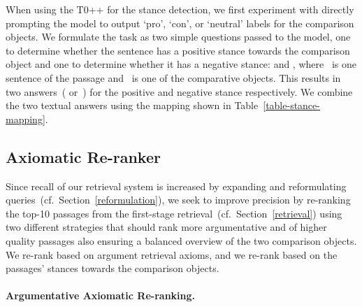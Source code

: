 When using the T0++ for the stance detection, we first experiment with directly prompting the model to output `pro', `con',  or `neutral' labels for the comparison objects.
We formulate the task as two simple questions passed to the model, one to determine whether the sentence has a positive stance towards the comparison object and one to determine whether it has a negative stance:  and , where ~is one sentence of the passage and ~is one of the comparative objects.
This results in two answers~( or~) for the positive and negative stance respectively. We combine the two textual answers using the mapping shown in Table~\ref{table-stance-mapping}.

\subsection{Axiomatic Re-ranker}
\label{reranking}


Since recall of our retrieval system is increased by expanding and reformulating queries~(cf.\ Section~\ref{reformulation}), we seek to improve precision by re-ranking the top-10 passages from the first-stage retrieval~(cf.\ Section~\ref{retrieval}) using two different strategies that should rank more argumentative and of higher quality passages also ensuring a balanced overview of the two comparison objects. \Ni We re-rank based on argument retrieval axioms, and \Nii we re-rank based on the passages' stances towards the comparison objects.

\paragraph{Argumentative Axiomatic Re-ranking.}

